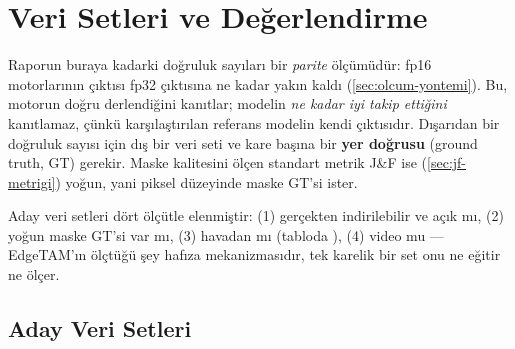 \chapter{Veri Setleri ve Değerlendirme}
\label{ch:veri-setleri}

Raporun buraya kadarki doğruluk sayıları bir \emph{parite} ölçümüdür:
fp16 motorlarının çıktısı fp32 çıktısına ne kadar yakın kaldı
(\cref{sec:olcum-yontemi}). Bu, motorun doğru derlendiğini kanıtlar;
modelin \emph{ne kadar iyi takip ettiğini} kanıtlamaz, çünkü
karşılaştırılan referans modelin kendi çıktısıdır. Dışarıdan bir
doğruluk sayısı için dış bir veri seti ve kare başına bir \textbf{yer
doğrusu} (ground truth, GT) gerekir. Maske kalitesini ölçen standart
metrik J\&F ise (\cref{sec:jf-metrigi}) yoğun, yani piksel düzeyinde
maske GT'si ister.

Aday veri setleri dört ölçütle elenmiştir: (1) gerçekten indirilebilir
ve açık mı, (2) yoğun maske GT'si var mı, (3) havadan mı
(tabloda \hava), (4) video mu --- EdgeTAM'ın ölçtüğü şey hafıza
mekanizmasıdır, tek karelik bir set onu ne eğitir ne ölçer.

\section{Aday Veri Setleri}
\label{sec:aday-veri-setleri}


